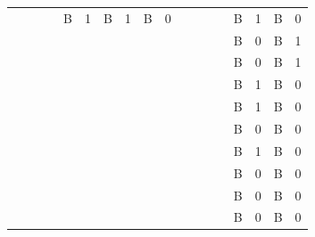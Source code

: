 \documentclass{article}
\begin{document}
\begin{table}
\begin{tabular}{l  l  l  l  l  l  l  l  l  l  l  l  l  l  l  l  l  l}
 &  &  &  & B & 1 & B & 1 & B & 0 &  &  &  &  & B & 1 & B & 0\\
 &  &  &  &  &  &  &  &  &  &  &  &  &  & B & 0 & B & 1\\
 &  &  &  &  &  &  &  &  &  &  &  &  &  & B & 0 & B & 1\\
 &  &  &  &  &  &  &  &  &  &  &  &  &  & B & 1 & B & 0\\
 &  &  &  &  &  &  &  &  &  &  &  &  &  & B & 1 & B & 0\\
 &  &  &  &  &  &  &  &  &  &  &  &  &  & B & 0 & B & 0\\
 &  &  &  &  &  &  &  &  &  &  &  &  &  & B & 1 & B & 0\\
 &  &  &  &  &  &  &  &  &  &  &  &  &  & B & 0 & B & 0\\
 &  &  &  &  &  &  &  &  &  &  &  &  &  & B & 0 & B & 0\\
 &  &  &  &  &  &  &  &  &  &  &  &  &  & B & 0 & B & 0\\


\end{tabular}
 

\end{table}
\end{document}
